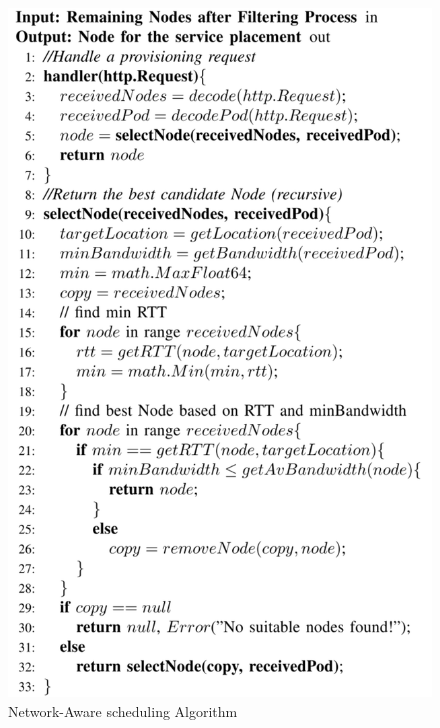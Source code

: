   \begin{figure}
    \centering
    \includegraphics[width=\linewidth]{figures/mlcn-k8s-ns-algo.pdf}
    \caption{Network-Aware scheduling Algorithm\cite{Santos2019}}
    \label{fig:k8s-ns-algo}
  \end{figure}
